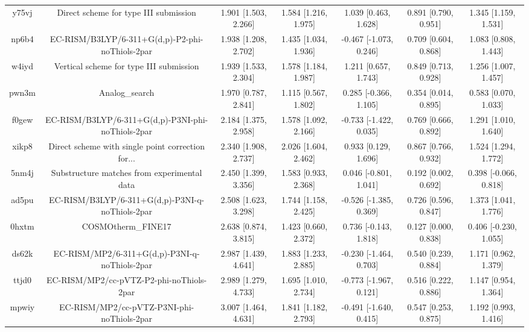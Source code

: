 \documentclass{article}
\begin{document}
\begin{center}
\begin{longtable}{|ccccccc|}
 y75vj &              Direct scheme for type III submission &  1.901 [1.503, 2.266] &  1.584 [1.216, 1.975] &     1.039 [0.463, 1.628] &  0.891 [0.790, 0.951] &   1.345 [1.159, 1.531] \\
 np6b4 &    EC-RISM/B3LYP/6-311+G(d,p)-P2-phi-noThiols-2par &  1.938 [1.208, 2.702] &  1.435 [1.034, 1.936] &   -0.467 [-1.073, 0.246] &  0.709 [0.604, 0.868] &   1.083 [0.808, 1.443] \\
 w4iyd &            Vertical scheme for type III submission &  1.939 [1.533, 2.304] &  1.578 [1.184, 1.987] &     1.211 [0.657, 1.743] &  0.849 [0.713, 0.928] &   1.256 [1.007, 1.457] \\
 pwn3m &                                     Analog\_search &  1.970 [0.787, 2.841] &  1.115 [0.567, 1.802] &    0.285 [-0.366, 1.105] &  0.354 [0.014, 0.895] &   0.583 [0.070, 1.033] \\
 f0gew &  EC-RISM/B3LYP/6-311+G(d,p)-P3NI-phi-noThiols-2par &  2.184 [1.375, 2.958] &  1.578 [1.092, 2.166] &   -0.733 [-1.422, 0.035] &  0.769 [0.666, 0.892] &   1.291 [1.010, 1.640] \\
 xikp8 &  Direct scheme with single point correction for... &  2.340 [1.908, 2.737] &  2.026 [1.604, 2.462] &     0.933 [0.129, 1.696] &  0.867 [0.766, 0.932] &   1.524 [1.294, 1.772] \\
 5nm4j &        Substructure matches from experimental data &  2.450 [1.399, 3.356] &  1.583 [0.933, 2.368] &    0.046 [-0.801, 1.041] &  0.192 [0.002, 0.692] &  0.398 [-0.066, 0.818] \\
 ad5pu &    EC-RISM/B3LYP/6-311+G(d,p)-P3NI-q-noThiols-2par &  2.508 [1.623, 3.298] &  1.744 [1.158, 2.425] &   -0.526 [-1.385, 0.369] &  0.726 [0.596, 0.847] &   1.373 [1.041, 1.776] \\
 0hxtm &                                 COSMOtherm\_FINE17 &  2.638 [0.874, 3.815] &  1.423 [0.660, 2.372] &    0.736 [-0.143, 1.818] &  0.127 [0.000, 0.838] &  0.406 [-0.230, 1.055] \\
 ds62k &      EC-RISM/MP2/6-311+G(d,p)-P3NI-q-noThiols-2par &  2.987 [1.439, 4.641] &  1.883 [1.233, 2.885] &   -0.230 [-1.464, 0.703] &  0.540 [0.239, 0.884] &   1.171 [0.962, 1.379] \\
 ttjd0 &           EC-RISM/MP2/cc-pVTZ-P2-phi-noThiols-2par &  2.989 [1.279, 4.733] &  1.695 [1.010, 2.734] &   -0.773 [-1.967, 0.121] &  0.516 [0.222, 0.886] &   1.147 [0.954, 1.364] \\
 mpwiy &         EC-RISM/MP2/cc-pVTZ-P3NI-phi-noThiols-2par &  3.007 [1.464, 4.631] &  1.841 [1.182, 2.793] &   -0.491 [-1.640, 0.415] &  0.547 [0.253, 0.875] &   1.192 [0.993, 1.416] \\

\end{longtable}
\end{center}
\end{document}
